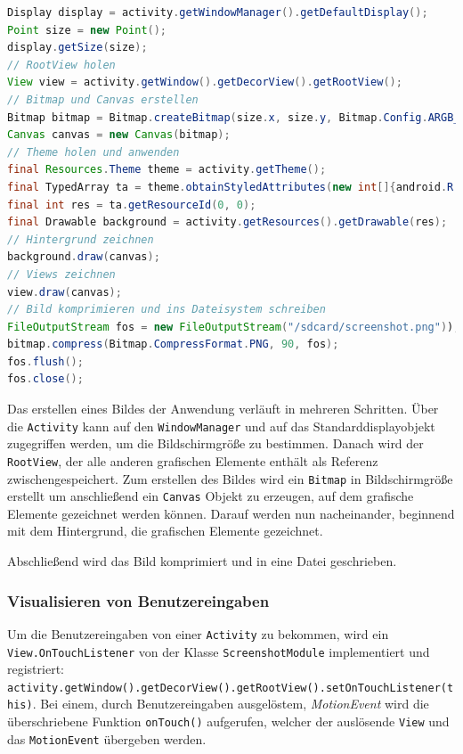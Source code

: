 \begin{lstlisting}[label=lst:client_screenshot,language=Java, caption=Screenshot Aufnahme ohne Root-Zugriff]
Display display = activity.getWindowManager().getDefaultDisplay();
Point size = new Point();
display.getSize(size);
// RootView holen
View view = activity.getWindow().getDecorView().getRootView();
// Bitmap und Canvas erstellen
Bitmap bitmap = Bitmap.createBitmap(size.x, size.y, Bitmap.Config.ARGB_4444);
Canvas canvas = new Canvas(bitmap);
// Theme holen und anwenden
final Resources.Theme theme = activity.getTheme();
final TypedArray ta = theme.obtainStyledAttributes(new int[]{android.R.attr.windowBackground});
final int res = ta.getResourceId(0, 0);
final Drawable background = activity.getResources().getDrawable(res);
// Hintergrund zeichnen
background.draw(canvas);
// Views zeichnen
view.draw(canvas);
// Bild komprimieren und ins Dateisystem schreiben
FileOutputStream fos = new FileOutputStream("/sdcard/screenshot.png"));
bitmap.compress(Bitmap.CompressFormat.PNG, 90, fos);
fos.flush();
fos.close();
\end{lstlisting}

Das erstellen eines Bildes der Anwendung verläuft in mehreren Schritten.
Über die \texttt{Activity} kann auf den \texttt{WindowManager} und auf das Standarddisplayobjekt zugegriffen werden, um die Bildschirmgröße zu bestimmen.
Danach wird der \texttt{RootView}, der alle anderen grafischen Elemente enthält als Referenz zwischengespeichert.
Zum erstellen des Bildes wird ein \texttt{Bitmap} in Bildschirmgröße erstellt um anschließend ein \texttt{Canvas} Objekt zu erzeugen, auf dem grafische Elemente gezeichnet werden können.
Darauf werden nun nacheinander, beginnend mit dem Hintergrund, die grafischen Elemente gezeichnet.

Abschließend wird das Bild komprimiert und in eine Datei geschrieben.

\subsubsection{Visualisieren von Benutzereingaben}
Um die Benutzereingaben von einer \texttt{Activity} zu bekommen, wird ein \texttt{View.OnTouchListener} von der Klasse \texttt{ScreenshotModule} implementiert und registriert:
\\
\texttt{activity.getWindow().getDecorView().getRootView().setOnTouchListener(this)}.
Bei einem, durch Benutzereingaben ausgelöstem, \emph{MotionEvent} wird die überschriebene Funktion \texttt{onTouch()} aufgerufen, welcher der auslösende \texttt{View} und das \texttt{MotionEvent} übergeben werden.

